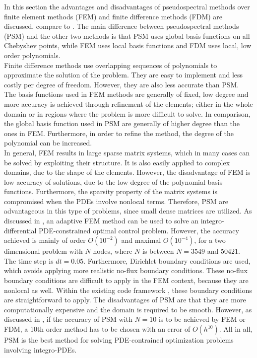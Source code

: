 In this section the advantages and disadvantages of pseudospectral methods over finite element methods (FEM) and finite difference methods (FDM) are discussed, compare to \cite{Boyd1}.
The main difference between pseudospectral methods (PSM) and the other two methods is that PSM uses global basis functions on all Chebyshev points, while FEM uses local basis functions and FDM uses local, low order polynomials.
\\
Finite difference methods use overlapping sequences of polynomials to approximate the solution of the problem. They are easy to implement and less costly per degree of freedom. However, they are also less accurate than PSM.
\\
The basis functions used in FEM methods are generally of fixed, low degree and more accuracy is achieved through refinement of the elements; either in the whole domain or in regions where the problem is more difficult to solve.
In comparison, the global basis function used in PSM are generally of higher degree than the ones in FEM. Furthermore, in order to refine the method, the degree of the polynomial can be increased.
\\
In general, FEM results in large sparse matrix systems, which in many cases can be solved by exploiting their structure. It is also easily applied to complex domains, due to the shape of the elements.
However, the disadvantage of FEM is low accuracy of solutions, due to the low degree of the polynomial basis functions. Furthermore, the sparsity property of the matrix systems is compromised when the PDEs involve nonlocal terms. Therefore, PSM are advantageous in this type of problems, since small dense matrices are utilized. 
 As discussed in \cite{FEMIntegroPaper}, an adaptive FEM method can be used to solve an integro-differential PDE-constrained optimal control problem. However, the accuracy achieved is mainly of order $O(10^{-2})$ and maximal $O(10^{-4})$, for a two dimensional problem with $N$ nodes, where $N$ is between $N=3549$ and $50421$. The time step is $dt=0.05$. Furthermore, Dirichlet boundary conditions are used, which avoids applying more realistic no-flux boundary conditions. These no-flux boundary conditions are difficult to apply in the FEM context, because they are nonlocal as well. Within the existing code framework \cite{GoddardPseudospectralCode1}, these boundary conditions are straightforward to apply.
The disadvantages of PSM are that they are more computationally expensive and the domain is required to be smooth.
However, as discussed in \cite{Boyd1}, if the accuracy of PSM with $N=10$ is to be achieved by FEM or FDM, a 10th order method has to be chosen with an error of $O(h^{10})$.
All in all, PSM is the best method for solving PDE-contrained optimization problems involving integro-PDEs.